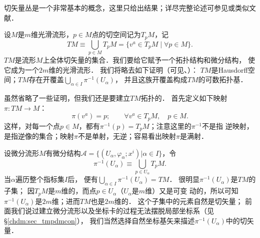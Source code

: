 切矢量丛是一个非常基本的概念，这里只给出结果；详尽完整论述可参见\textcite[pp. 63-106]{spivak-dif-1}或类似文献．

设$M$是$m$维光滑流形，$p\in M$点的切空间记为$T_pM$，记
\begin{equation}\label{chdm:eqn_tangent-bundle-set}
    TM \equiv \bigcup _{p\in M} T_pM = \{v^a \in T_pM \mid \forall p\in M\} .
\end{equation}
$TM$是流形$M$上全体切矢量的集合．我们要给它赋予一个拓扑结构和微分结构，
使它成为一个$2m$维的光滑流形．
我们将略去如下证明（可见\parencite[\S 3.1]{chenwh2001}、\parencite[\S 12.1]{tu-IM-2011}）：
$TM$是Hausdorff空间；$TM$存在开覆盖$\bigcup _{\alpha\in I} \pi^{-1} (U_\alpha)$，
并且这族开覆盖构成$TM$的可数拓扑基．

虽然省略了一些证明，但我们还是要建立$TM$拓扑的．
首先定义如下映射$\pi:TM\to M$：
\begin{equation}
    \pi(v^a) = p; \qquad \forall v^a\in T_pM,\quad p\in M.
\end{equation}
这样，对每一个点$p\in M$，都有$\pi^{-1}(p)=T_pM$；注意这里的$\pi^{-1}$不是指
逆映射，是指逆像的集合；映射$\pi$不是单射，无逆；容易看出映射$\pi$是满射．

设微分流形$M$有微分结构$\mathscr{A}=\{(U_\alpha,\varphi_\alpha;x^i)|\alpha \in I \}$，令
\begin{equation}
    \pi^{-1} (U_\alpha) \equiv \bigcup _{p\in U_\alpha} T_pM .
\end{equation}
当$\alpha$遍历整个指标集$I$后，
便有$\bigcup _{\alpha \in I}  \pi^{-1} (U_\alpha) = TM$．
很明显$\pi^{-1} (U_\alpha)$是$TM$的子集；
因$T_pM$是$m$维的，而点$p\in U_\alpha$（$U_\alpha$是$m$维）又是可变
动的，所以可知$\pi^{-1} (U_\alpha)$是$2m$维；进而$TM$也是$2m$维的．
这个子集中的元素自然是切矢量；
前面我们说过建立微分流形以及坐标卡的过程无法摆脱局部坐标系（见\S \ref{chdm:sec_tmpdmcon}），
我们当然选择自然坐标基矢来描述$\pi^{-1} (U_\alpha)$中的切矢量．


